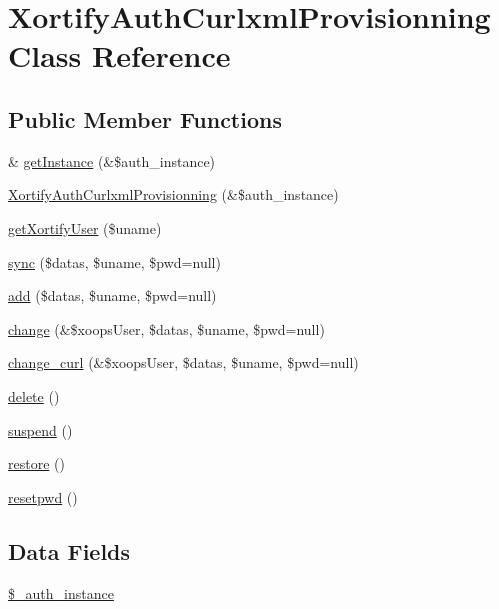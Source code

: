 \hypertarget{class_xortify_auth_curlxml_provisionning}{\section{Xortify\-Auth\-Curlxml\-Provisionning Class Reference}
\label{class_xortify_auth_curlxml_provisionning}
}
\subsection*{Public Member Functions}
\begin{DoxyCompactItemize}
\item 
\& \hyperlink{class_xortify_auth_curlxml_provisionning_a2c8eaa915c70d75289ac8a03686194f9}{get\-Instance} (\&\$auth\-\_\-instance)
\item 
\hyperlink{class_xortify_auth_curlxml_provisionning_accc0d33e8eb86362d253e29bd29fcc2e}{Xortify\-Auth\-Curlxml\-Provisionning} (\&\$auth\-\_\-instance)
\item 
\hyperlink{class_xortify_auth_curlxml_provisionning_a041d726ac26672547ed1504e8e0117aa}{get\-Xortify\-User} (\$uname)
\item 
\hyperlink{class_xortify_auth_curlxml_provisionning_a35dc08b0f2138eb818ff95345b73bcff}{sync} (\$datas, \$uname, \$pwd=null)
\item 
\hyperlink{class_xortify_auth_curlxml_provisionning_adfc9fcef01e7bd7b2f47e8e79d51fc63}{add} (\$datas, \$uname, \$pwd=null)
\item 
\hyperlink{class_xortify_auth_curlxml_provisionning_ae1f0971b9712c794620cf309164e43af}{change} (\&\$xoops\-User, \$datas, \$uname, \$pwd=null)
\item 
\hyperlink{class_xortify_auth_curlxml_provisionning_aba6f598c234d191a3b3934f90b35fd9f}{change\-\_\-curl} (\&\$xoops\-User, \$datas, \$uname, \$pwd=null)
\item 
\hyperlink{class_xortify_auth_curlxml_provisionning_a13bdffdd926f26b825ea57066334ff01}{delete} ()
\item 
\hyperlink{class_xortify_auth_curlxml_provisionning_ad73006a505121228f3b075c2409787d2}{suspend} ()
\item 
\hyperlink{class_xortify_auth_curlxml_provisionning_aa1371f22826cf8cde4454c9b467203d0}{restore} ()
\item 
\hyperlink{class_xortify_auth_curlxml_provisionning_a06d70fbd3a2db390b6f2530c0076628e}{resetpwd} ()
\end{DoxyCompactItemize}
\subsection*{Data Fields}
\begin{DoxyCompactItemize}
\item 
\hyperlink{class_xortify_auth_curlxml_provisionning_a486ed878bb5a7188c99ac4c9ee46ac6e}{\$\-\_\-auth\-\_\-instance}
\end{DoxyCompactItemize}


